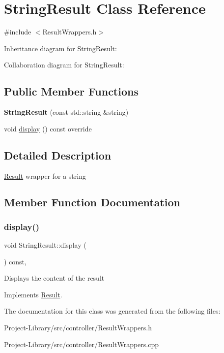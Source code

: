 \hypertarget{classStringResult}{}\section{String\+Result Class Reference}
\label{classStringResult}


{\ttfamily \#include $<$Result\+Wrappers.\+h$>$}



Inheritance diagram for String\+Result\+:


Collaboration diagram for String\+Result\+:
\subsection*{Public Member Functions}
\begin{DoxyCompactItemize}
\item 
\mbox{\label{classStringResult_a0ce5774e2ef4fe6a45d138445be51651}} 
{\bfseries String\+Result} (const std\+::string \&string)
\item 
void \hyperlink{classStringResult_a8500687e59dcf646cf3dbdef33ab8703}{display} () const override
\end{DoxyCompactItemize}


\subsection{Detailed Description}
\hyperlink{classResult}{Result} wrapper for a string 

\subsection{Member Function Documentation}
\mbox{\label{classStringResult_a8500687e59dcf646cf3dbdef33ab8703}} 
\subsubsection{\texorpdfstring{display()}{display()}}
{\footnotesize\ttfamily void String\+Result\+::display (\begin{DoxyParamCaption}{ }\end{DoxyParamCaption}) const\hspace{0.3cm}{\ttfamily [override]}, {\ttfamily [virtual]}}

Displays the content of the result 

Implements \hyperlink{classResult_a625729bae46b53c231feb50a91b1390e}{Result}.



The documentation for this class was generated from the following files\+:\begin{DoxyCompactItemize}
\item 
Project-\/\+Library/src/controller/Result\+Wrappers.\+h\item 
Project-\/\+Library/src/controller/Result\+Wrappers.\+cpp\end{DoxyCompactItemize}
